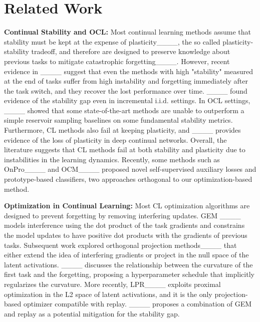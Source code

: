 \section{Related Work}
\textbf{Continual Stability and OCL:} Most continual learning methods assume that stability must be kept at the expense of plasticity____, the so called plasticity-stability tradeoff, and therefore are designed to preserve knowledge about previous tasks to mitigate catastrophic forgetting____. However, recent evidence in ____ suggest that even the methods with high "stability" measured at the end of tasks suffer from high instability and forgetting immediately after the task switch, and they recover the lost performance over time. ____ found evidence of the stability gap even in incremental i.i.d. settings. In OCL settings, ____ showed that some state-of-the-art methods are unable to outperform a simple reservoir sampling baselines on some fundamental stability metrics. 
Furthermore, CL methods also fail at keeping plasticity, and ____ provides evidence of the loss of plasticity in deep continual networks. Overall, the literature suggests that CL methods fail at both stability and plasticity due to instabilities in the learning dynamics. Recently, some methods such as OnPro____ and OCM____ proposed novel self-supervised auxiliary losses and prototype-based classifiers, two approaches orthogonal to our optimization-based method.

\textbf{Optimization in Continual Learning:} Most CL optimization algorithms are designed to prevent forgetting by removing interfering updates. GEM ____ models interference using the dot product of the task gradients and constrains the model updates to have positive dot products with the gradients of previous tasks. Subsequent work explored orthogonal projection methods____ that either extend the idea of interfering gradients or project in the null space of the latent activations. ____ discusses the relationship between the curvature of the first task and the forgetting, proposing a hyperparameter schedule that implicitly regularizes the curvature. More recently, LPR____ exploits proximal optimization in the L2 space of latent activations, and it is the only projection-based optimizer compatible with replay. ____ proposes a combination of GEM and replay as a potential mitigation for the stability gap.

